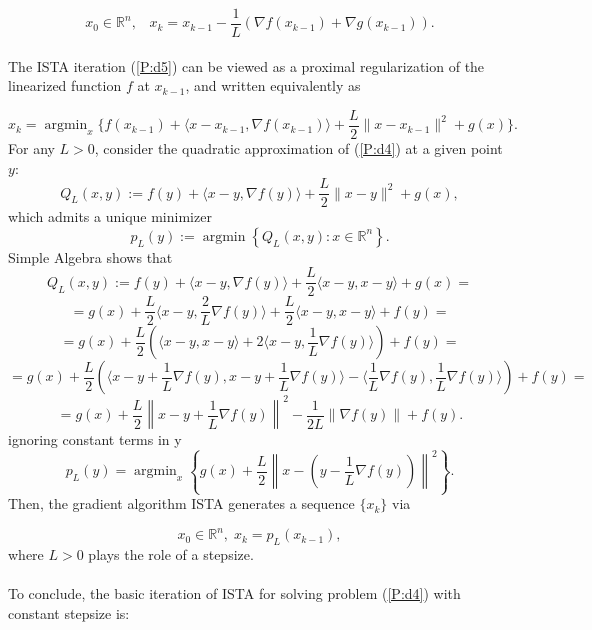 \documentclass[12pt]{article}
\DeclareMathOperator*{\argmin}{argmin} %
\begin{document}
\begin{equation}\label{P:d5}
x_0 \in \mathbb{R}^n, \;\;\; x_k = x_{k-1} -\frac{1}{L}(\nabla f(x_{k-1})+\nabla g(x_{k-1})).
\end{equation}
\\The ISTA iteration (\ref{P:d5}) can be viewed as a proximal regularization of the linearized function $f$ at $x_{k-1}$, and written equivalently as

$$x_k = \argmin_x \{f(x_{k-1}) +\langle x-x_{k-1}, \nabla f(x_{k-1}) \rangle +\frac{L}{2} \|x-x_{k-1}\|^2 + g(x)\} .$$ 
For any $L > 0$, consider the quadratic approximation of (\ref{P:d4}) at a given point $y$:
$$Q_L (x,y) := f(y) + \langle x-y, \nabla f(y)\rangle + \frac{L}{2} \|x-y\|^2 + g(x),$$
which admits a unique minimizer
$$p_L(y) := \argmin \left\{Q_L(x,y) :x \in \mathbb{R}^n\right\}.$$
Simple Algebra shows that 
$$Q_L (x,y) := f(y) + \langle x-y, \nabla f(y)\rangle + \frac{L}{2} \langle x-y,x-y \rangle + g(x) =$$
$$= g(x) + \frac{L}{2} \langle x-y, \frac{2}{L} \nabla f(y)\rangle + \frac{L}{2} \langle x-y,x-y \rangle + f(y) =$$
$$= g(x) + \frac{L}{2} \left( \langle x-y,x-y \rangle + 2 \langle x-y, \frac{1}{L} \nabla f(y)\rangle  \right) + f(y) =$$
$$= g(x) + \frac{L}{2} \left(\langle x-y + \frac{1}{L}\nabla f(y), x-y + \frac{1}{L}\nabla f(y)\rangle -  \langle \frac{1}{L}\nabla f(y),\frac{1}{L}\nabla f(y) \rangle \right) + f(y) =$$
$$= g(x) + \frac{L}{2} \left \|x-y + \frac{1}{L}\nabla f(y)\right\|^2 - \frac{1}{2L} \left\|\nabla f(y)\right\| + f(y).$$
ignoring constant terms in y
$$p_L (y) = \argmin_{x} \left\{g(x) + \frac{L}{2} \left\| x-\left(y-\dfrac{1}{L}\nabla f(y)\right)\right\|^2\right\}.$$
Then, the gradient algorithm ISTA generates a sequence $\{x_k\}$ via

$$ x_0 \in \mathbb{R}^n,\; x_k =p_L(x_{k-1}),$$
where $L>0$ plays the role of a stepsize.\\
\\To conclude,  the basic iteration of ISTA for solving problem (\ref{P:d4}) with constant stepsize is:\\
\\
\end{document}
